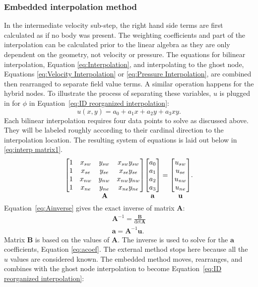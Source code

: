 \documentclass[preprint,12pt]{elsarticle}
\newcommand*{\putunder}[2]{%
	{\mathop{#1}_{\textstyle #2}}%
}
\begin{document}
\subsubsection{Embedded interpolation method}
\label{sec:ID embedded}
In the intermediate velocity sub-step, the right hand side terms are first calculated as if no body was present. 
The weighting coefficients and part of the interpolation can be calculated prior to the linear algebra as they are only dependent on the geometry, not velocity or pressure. 
The equations for bilinear interpolation, Equation \eqref{eq:Interpolation}, and interpolating to the ghost node, Equations \eqref{eq:Velocity Interpolation} or \eqref{eq:Pressure Interpolation}, are combined then rearranged to separate field value terms. 
A similar operation happens for the hybrid nodes. 
To illustrate the process of separating these variables, $u$ is plugged in for $\phi$ in Equation~\eqref{eq:ID reorganized interpolation}:
\begin{equation}
u(x,y) = a_0 + a_1x +a_2y+a_3xy.
\end{equation}
Each bilinear interpolation requires four data points to solve as discussed above.  
They will be labeled roughly according to their cardinal direction to the interpolation location. 
The resulting system of equations is laid out below in \eqref{eq:interp matrix1}.
\begin{gather}
\putunder{
	\begin{bmatrix}
	1&x_{sw}&y_{sw}&x_{sw}y_{sw}\\
	1&x_{se}&y_{se}&x_{se}y_{se}\\
	1&x_{nw}&y_{nw}&x_{nw}y_{nw}\\
	1&x_{ne}&y_{ne}&x_{ne}y_{ne}
	\end{bmatrix}
}{\textbf{A}}
\putunder{
	\begin{bmatrix}
	a_0\\
	a_1\\
	a_2\\
	a_3
	\end{bmatrix}
}{\textbf{a}\vphantom{A}}
=
\putunder{
	\begin{bmatrix}
	u_{sw}\\
	u_{se}\\
	u_{nw}\\
	u_{ne}
	\end{bmatrix}
}{\textbf{u}\vphantom{A}}.
\label{eq:interp matrix2}
\end{gather}
Equation~\eqref{eq:Ainverse} gives the exact inverse of matrix $\textbf{A}$:
\begin{align}
\textbf{A}^{-1} = \frac{\textbf{B}}{\det{\textbf{A}}}
\label{eq:Ainverse}\\
\textbf{a}=\textbf{A}^{-1}\textbf{u}.\;\label{eq:acoef}
\end{align}
Matrix $\textbf{B}$ is based on the values of $\textbf{A}$. 
The inverse is used to solve for the $\textbf{a}$ coefficients, Equation \eqref{eq:acoef}.
The external method stops here because all the $u$ values are considered known. 
The embedded method moves, rearranges, and combines with the ghost node interpolation to become Equation~\eqref{eq:ID reorganized interpolation}:
\end{document}
